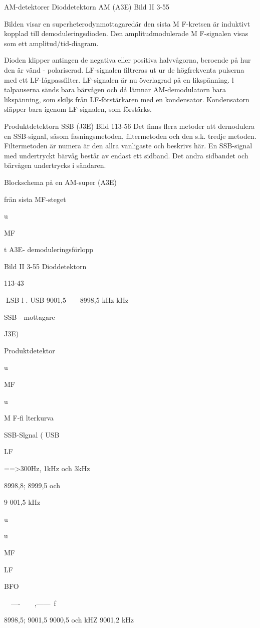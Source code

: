 {{{AM-detektorer
Dioddetektorn AM (A3E)
Bild II 3-55

Bilden visar en superheterodynmottagaredär den sista M F-kretsen är induktivt kopplad till demoduleringsdioden. Den amplitudmodulerade M F-signalen visas som ett amplitud/tid-diagram.

Dioden klipper antingen de negativa eller
positiva halvvågorna, beroende på hur den
är vänd - polariserad.
LF-signalen filtreras ut ur de högfrekventa pulserna med ett LF-Iågpassfilter.
LF-signalen är nu överlagrad på en likspänning. l talpauserna sänds bara bärvågen och då lämnar AM-demodulatorn bara
likspänning, som skiljs från LF-förstärkaren
med en kondensator. Kondensatorn släpper
bara igenom LF-signalen, som förstärks.

Produktdetektorn SSB (J3E)
Bild 113-56
Det finns flera metoder att dernodulera en
SSB-signal, såsom fasningsmetoden, filtermetoden och den s.k. tredje metoden. Filtermetoden är numera är den allra vanligaste
och beskrivs här.
En SSB-signal med undertryckt bärvåg
består av endast ett sidband. Det andra
sidbandet och bärvågen undertrycks i sändaren.

Blockschema på en
AM-super (A3E)

frän sista MF-steget

u

MF

t
A3E- demoduleringsförlopp

Bild II 3-55 Dioddetektorn

113-43

LSB
l . USB
9001,5 ~ ~ 8998,5
kHz
kHz

SSB - mottagare {J3E)

Produktdetektor

u

MF

u

M F-fi lterkurva

SSB-Slgnal
( USB}

LF

==>300Hz, 1kHz och 3kHz

8998,8;
8999,5 och

9 001,5 kHz

u

u

MF

LF

BFO

~~----~~~~,------~f

8998,5;
9001,5
9000,5 och
kHZ
9001,2 kHz

}}}
